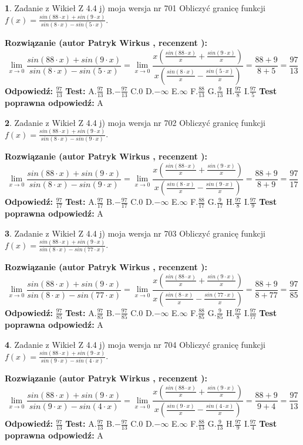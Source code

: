\documentclass[12pt, a4paper]{article}
\theoremstyle{definition} %
\newtheorem{zad}{}
\newcommand{\zadStart}[1]{\begin{zad}#1\newline}
\newcommand{\zadStop}{\end{zad}}
\newcommand{\rozwStart}[2]{\noindent \textbf{Rozwiązanie (autor #1 , recenzent #2): }\newline}
\newcommand{\rozwStop}{\newline}
\newcommand{\odpStart}{\noindent \textbf{Odpowiedź:}\newline}
\newcommand{\odpStop}{\newline}
\newcommand{\testStart}{\noindent \textbf{Test:}\newline}
\newcommand{\testStop}{\newline}
\newcommand{\kluczStart}{\noindent \textbf{Test poprawna odpowiedź:}\newline}
\newcommand{\kluczStop}{\newline}
\begin{document}
\zadStart{Zadanie z Wikieł Z 4.4 j) moja wersja nr 701}
Obliczyć granicę funkcji $f(x)=\frac{sin(88\cdot x) +sin(9\cdot x)}{sin(8\cdot x) -sin(5\cdot x)}$.
\zadStop
\rozwStart{Patryk Wirkus}{}
$$\lim\limits_{x\to 0}\frac{sin(88\cdot x) +sin(9\cdot x)}{sin(8\cdot x) -sin(5\cdot x)}=\lim\limits_{x\to 0}\frac{x(\frac{sin(88\cdot x)}{x}+\frac{sin(9\cdot x)}{x})}{x(\frac{sin(8\cdot x)}{x}-\frac{sin(5\cdot x)}{x})}=\frac{88+9}{8+5} = \frac{97}{13}$$
\rozwStop
\odpStart
$\frac{97}{13}$
\odpStop
\testStart
A.$\frac{97}{13}$
B.$-\frac{97}{13}$
C.$0$
D.$-\infty$
E.$\infty$
F.$\frac{88}{13}$
G.$\frac{9}{13}$
H.$\frac{97}{8}$
I.$\frac{97}{5}$
\testStop
\kluczStart
A
\kluczStop



\zadStart{Zadanie z Wikieł Z 4.4 j) moja wersja nr 702}
Obliczyć granicę funkcji $f(x)=\frac{sin(88\cdot x) +sin(9\cdot x)}{sin(8\cdot x) -sin(9\cdot x)}$.
\zadStop
\rozwStart{Patryk Wirkus}{}
$$\lim\limits_{x\to 0}\frac{sin(88\cdot x) +sin(9\cdot x)}{sin(8\cdot x) -sin(9\cdot x)}=\lim\limits_{x\to 0}\frac{x(\frac{sin(88\cdot x)}{x}+\frac{sin(9\cdot x)}{x})}{x(\frac{sin(8\cdot x)}{x}-\frac{sin(9\cdot x)}{x})}=\frac{88+9}{8+9} = \frac{97}{17}$$
\rozwStop
\odpStart
$\frac{97}{17}$
\odpStop
\testStart
A.$\frac{97}{17}$
B.$-\frac{97}{17}$
C.$0$
D.$-\infty$
E.$\infty$
F.$\frac{88}{17}$
G.$\frac{9}{17}$
H.$\frac{97}{8}$
I.$\frac{97}{9}$
\testStop
\kluczStart
A
\kluczStop



\zadStart{Zadanie z Wikieł Z 4.4 j) moja wersja nr 703}
Obliczyć granicę funkcji $f(x)=\frac{sin(88\cdot x) +sin(9\cdot x)}{sin(8\cdot x) -sin(77\cdot x)}$.
\zadStop
\rozwStart{Patryk Wirkus}{}
$$\lim\limits_{x\to 0}\frac{sin(88\cdot x) +sin(9\cdot x)}{sin(8\cdot x) -sin(77\cdot x)}=\lim\limits_{x\to 0}\frac{x(\frac{sin(88\cdot x)}{x}+\frac{sin(9\cdot x)}{x})}{x(\frac{sin(8\cdot x)}{x}-\frac{sin(77\cdot x)}{x})}=\frac{88+9}{8+77} = \frac{97}{85}$$
\rozwStop
\odpStart
$\frac{97}{85}$
\odpStop
\testStart
A.$\frac{97}{85}$
B.$-\frac{97}{85}$
C.$0$
D.$-\infty$
E.$\infty$
F.$\frac{88}{85}$
G.$\frac{9}{85}$
H.$\frac{97}{8}$
I.$\frac{97}{77}$
\testStop
\kluczStart
A
\kluczStop



\zadStart{Zadanie z Wikieł Z 4.4 j) moja wersja nr 704}
Obliczyć granicę funkcji $f(x)=\frac{sin(88\cdot x) +sin(9\cdot x)}{sin(9\cdot x) -sin(4\cdot x)}$.
\zadStop
\rozwStart{Patryk Wirkus}{}
$$\lim\limits_{x\to 0}\frac{sin(88\cdot x) +sin(9\cdot x)}{sin(9\cdot x) -sin(4\cdot x)}=\lim\limits_{x\to 0}\frac{x(\frac{sin(88\cdot x)}{x}+\frac{sin(9\cdot x)}{x})}{x(\frac{sin(9\cdot x)}{x}-\frac{sin(4\cdot x)}{x})}=\frac{88+9}{9+4} = \frac{97}{13}$$
\rozwStop
\odpStart
$\frac{97}{13}$
\odpStop
\testStart
A.$\frac{97}{13}$
B.$-\frac{97}{13}$
C.$0$
D.$-\infty$
E.$\infty$
F.$\frac{88}{13}$
G.$\frac{9}{13}$
H.$\frac{97}{9}$
I.$\frac{97}{4}$
\testStop
\kluczStart
A
\kluczStop
\end{document}
